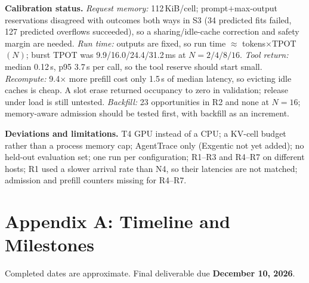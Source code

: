 \documentclass[10pt,twocolumn,letterpaper]{article}
\begin{document}
\textbf{Calibration status.}
\emph{Request memory:} 112\,KiB/cell; prompt$+$max-output reservations disagreed with outcomes both ways in S3 (34 predicted fits failed, 127 predicted overflows succeeded), so a sharing/idle-cache correction and safety margin are needed.
\emph{Run time:} outputs are fixed, so run time $\approx$ tokens$\times$TPOT$(N)$; burst TPOT was 9.9/16.0/24.4/31.2\,ms at $N{=}2/4/8/16$.
\emph{Tool return:} median 0.12\,s, p95 3.7\,s per call, so the tool reserve should start small.
\emph{Recompute:} 9.4$\times$ more prefill cost only 1.5\,s of median latency, so evicting idle caches is cheap. A slot erase returned occupancy to zero in validation; release under load is still untested.
\emph{Backfill:} 23 opportunities in R2 and none at $N{=}16$; memory-aware admission should be tested first, with backfill as an increment.

\textbf{Deviations and limitations.} T4 GPU instead of a CPU; a KV-cell budget rather than a process memory cap; AgentTrace only (Exgentic not yet added); no held-out evaluation set; one run per configuration; R1--R3 and R4--R7 on different hosts; R1 used a slower arrival rate than N4, so their latencies are not matched; admission and prefill counters missing for R4--R7.

\clearpage
\onecolumn
\appendix
\section*{Appendix A: Timeline and Milestones}
Completed dates are approximate. Final deliverable due \textbf{December 10, 2026}.
\end{document}
